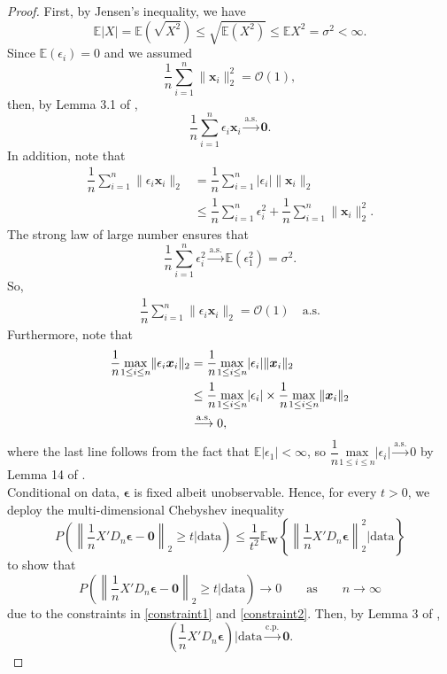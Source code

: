 \documentclass[12pt]{article}
\newcommand{\EX}{\mathbb{E}} %
\newcommand{\ep}{\bm{\epsilon}} %
\newcommand{\sumin}{\sum_{i=1}^n} %
\newcommand{\dn}{\dfrac{1}{n}} %
\newcommand{\CONV}[1]{\stackrel{\text{#1}}{\longrightarrow}} %
\newcommand{\x}{\bm{x}_i} %
\begin{document}
\begin{proof}
	First, by Jensen's inequality, we have
	$$
	\EX |X| = \EX (\sqrt{X^2}) 
			\leq \sqrt{\EX (X^2)} 
			\leq \EX X^2
			= \sigma^2 
			< \infty.
	$$
	Since $\EX(\epsilon_i) = 0$ and we assumed
	$$
	\dn \sumin \| \x  \|_2^2 = \mathcal{O} (1),
	$$
	then, by Lemma 3.1 of \citet{Chatterjee&Lahiri},
	$$
	\dn 
	\sumin \epsilon_i \x
	\CONV{a.s.} \bm{0}.
	$$
	In addition, note that 
	\begin{align*}
	\dn \sumin \|\epsilon_i \x \|_2 
	&= \dn \sumin |\epsilon_i| \|\x\|_2 \\
	&\leq \dn \sumin \epsilon_i^2 
		 + \dn \sumin \|\x\|_2^2. 
	\end{align*}
	The strong law of large number ensures that 
	$$
	\dn \sumin \epsilon_i^2 
	\CONV{a.s.} \EX (\epsilon_1^2) = \sigma^2. 
	$$
	So,    
	\begin{align} \label{constraint1}
	\dn \sumin \|\epsilon_i \x \|_2 = \mathcal{O} (1) \quad \text{a.s.}
	\end{align}
	Furthermore, note that
	\begin{align} \label{constraint2} 
	\dn \underset{1 \leq i \leq n}{\text{max}}  \|\epsilon_i \x \|_2 
	&= \dn \underset{1 \leq i \leq n}{\text{max}} |\epsilon_i| \|\x\|_2 \notag \\ 
	&\leq \dn \underset{1 \leq i \leq n}{\text{max}} |\epsilon_i| 
		\times \dn \underset{1 \leq i \leq n}{\text{max}} \|\x\|_2 \notag \\
	&\CONV{a.s.} 0,
	\end{align}
	where the last line follows from the fact that $\EX |\epsilon_1| < \infty$, so $\dn \underset{1 \leq i \leq n}{\text{max}} |\epsilon_i| \CONV{a.s.} 0$ by Lemma 14 of \citet{newton1991}. \\
	
	Conditional on data, $\ep$ is fixed albeit unobservable. Hence, for every $t > 0$, we deploy the multi-dimensional Chebyshev inequality 
	$$
	P \left( 
			\left\|  
					\dn X' D_n \ep - \bm{0} 
			\right\|_2  
			\geq t \bigg| \text{data}  
	  \right) 
	\leq \dfrac{1}{t^2}
		 \EX_{\bm{W}} \left\{ 
		 			  	 \left\| 
		 			  		\dn X' D_n \ep 
		 			  	 \right\|_2^2 \bigg| \text{data}
		 			  \right\}
	$$
	to show that 
	$$      
	P \left( 
			\left\|  
					\dn X' D_n \ep - \bm{0} 
			\right\|_2 
			\geq t \bigg| \text{data}  
	  \right) 
	\to 0
	\qquad \text{as} \qquad n \to \infty 
	$$ 
	due to the constraints in \eqref{constraint1} and \eqref{constraint2}. Then, by Lemma 3 of \citet{newton1991},
	$$
	\left( \dn X'D_n \ep \right) \bigg| \text{data} \CONV{c.p.} \bm{0}.
	$$ 
\end{proof}
\end{document}
